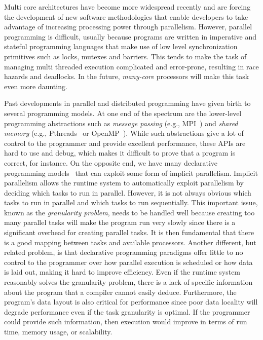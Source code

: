 Multi core architectures have become more widespread recently and are forcing the
development of new software methodologies that enable developers to take
advantage of increasing processing power through parallelism. However, parallel
programming is difficult, usually because programs are written in imperative and
stateful programming languages that make use of low level synchronization
primitives such as locks, mutexes and barriers. This tends to make the task of
managing multi threaded execution complicated and error-prone, resulting in race
hazards and deadlocks. In the future, \emph{many-core} processors will make this
task even more daunting.

Past developments in parallel and distributed programming have given birth to
several programming models. At one end of the spectrum are the lower-level
programming abstractions such as \emph{message passing} (e.g.,
MPI~\cite{gabriel04-open-mpi}) and \emph{shared memory} (e.g.,
Pthreads~\cite{Butenhof:1997:PPT:263953} or
OpenMP~\cite{Chapman-2007-UOP-1370966}). While such abstractions give a lot of
control to the programmer and provide excellent performance, these APIs are hard
to use and debug, which makes it difficult to prove that a program is correct,
for instance. On the opposite end, we have many declarative programming
models~\cite{Blelloch:1996:PPA:227234.227246} that can exploit some form of
implicit parallelism. Implicit parallelism allows the runtime system to
automatically exploit parallelism by deciding which tasks to run in parallel.
However, it is not always obvious which tasks to run in parallel and which tasks
to run sequentially. This important issue, known as the \emph{granularity
problem}, needs to be handled well because creating too many parallel tasks will
make the program run very slowly since there is a significant overhead for
creating parallel tasks. It is then fundamental that there is a good mapping
between tasks and available processors.  Another different, but related problem,
is that declarative programming paradigms offer little to no control to the
programmer over how parallel execution is scheduled or how data is laid out,
making it hard to improve efficiency. Even if the runtime system reasonably
solves the granularity problem, there is a lack of specific information about
the program that a compiler cannot easily deduce. Furthermore, the program's
data layout is also critical for performance since poor data locality will
degrade performance even if the task granularity is optimal.  If the programmer
could provide such information, then execution would improve in terms of run
time, memory usage, or scalability.

